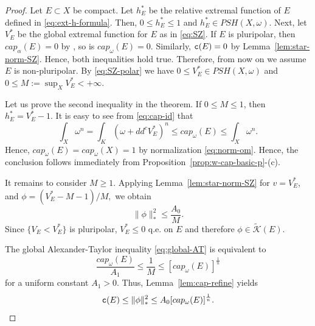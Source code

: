 \documentclass{amsart}
\newcommand{\wt}[1]{\widetilde{#1}}
\newcommand{\al}{\alpha}
\newcommand{\om}{\omega}
\newcommand{\tc}{{\tt c}}
\newcommand{\cali}[1]{\mathscr{#1}}
\newcommand{\Kc}{\cali{K}}
\theoremstyle{definition}
\numberwithin{thm}{section}
\numberwithin{equation}{section}
\renewcommand{\[}{\begin{equation}}
\renewcommand{\]}{\end{equation}}
\begin{document}
\begin{proof}  Let $E\subset X$ be compact. 
Let $h_E^*$ be the relative extremal function of $E$ defined in \eqref{eq:ext-h-formula}.
Then, $0\leq h_E^* \leq 1$ and $h_E^* \in PSH(X,\om)$. 
Next, let $V_E^*$ be the global extremal function for $E$ as in \eqref{eq:SZ}. If $E$ is pluripolar, then $cap_\al(E)=0$ by \cite[Corollary~9.9, Theorem~9.17]{GZ-book}, so is $cap_\om(E)=0$. Similarly, $\tc(E)=0$ by Lemma~\ref{lem:star-norm-SZ}. Hence, both inequalities hold true.  Therefore, from now on we  assume $E$ is non-pluripolar. 
By \eqref{eq:SZ-polar} we have $0\leq V_E^* \in PSH(X,\om)$ and 
$0\leq M:= \sup_X V_E^*<+\infty.$


Let us prove  the second inequality in the theorem.  If $0 \leq M \leq 1$, then $h_E^* = V_E^* -1$. It is easy to see from \eqref{eq:cap-id} that 
$$
	\int_X \om^n = \int_K (\om+ dd^c V_E^*)^n \leq cap_\om(E)  \leq \int_X \om^n.
$$
Hence,
$cap_\om(E) = cap_\om(X)=1$ by normalization \eqref{eq:norm-om}. Hence,  the conclusion  follows immediately from Proposition~\ref{prop:w-cap-basic-p}-(c).

It remains to consider  $M \geq 1$.
Applying Lemma~\ref{lem:star-norm-SZ} for $v= V_E^*$,  
and $\phi = (V_E^* - M-1)/M,$ we obtain 
\[\label{eq:w-norm-AT-cap}
	\|\phi\|_*^2 \leq \frac{A_0}{M}.
\]
Since $\{V_E < V_E^*\}$ is pluripolar,  $V_E^* \leq 0$ q.e. on $E$ and therefore  $\phi\in \wt\Kc(E)$.

The  global Alexander-Taylor inequality \eqref{eq:global-AT} is equivalent to  
\[\label{eq:global-AT-use}
\frac{cap_\om(E)}{A_1} 	\leq \frac{1}{M} \leq  [cap_\om(E)]^\frac{1}{n}
\]
for a uniform constant $A_1>0$. Thus, Lemma~\ref{lem:cap-refine} yields
$$
	\tc(E) \leq \|\phi\|_*^2 \leq  A_0 [cap_\om(E)]^\frac{1}{n}.
$$


\end{proof}
\end{document}
